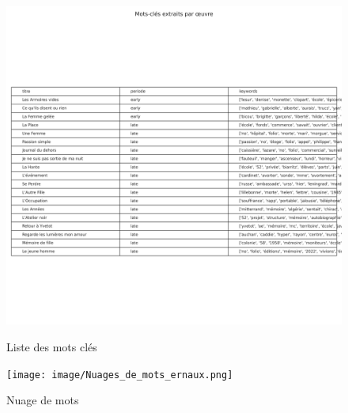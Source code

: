 \begin{figure}[H]
    \centering
    \begin{minipage}{0.5\textwidth}
        \centering
        \includegraphics[width=\textwidth]{image/Table_keywords_ernaux.png} %
        \caption{Liste des mots clés}
        \label{fig:Table de mot-clés des ouvrages d'Ernaux}
    \end{minipage}%
    \hfill
    \begin{minipage}{0.5\textwidth}
        \centering
        \texttt{[image: image/Nuages\_de\_mots\_ernaux.png]}  %
        \caption{Nuage de mots}
        \label{fig:Nuage de mots}
    \end{minipage}
\end{figure}

